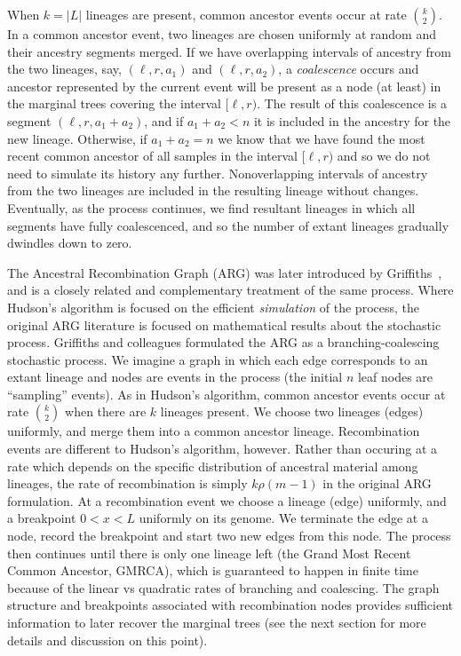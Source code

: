 \documentclass{article}
\begin{document}
When $k = |L|$ lineages are present, common ancestor events
occur at rate $\binom{k}{2}$. In a common ancestor event, two lineages
are chosen uniformly at random and their ancestry segments merged.
If we have overlapping intervals of ancestry from the two lineages,
say, $(\ell, r, a_1)$ and $(\ell, r, a_2)$, a
\emph{coalescence} occurs and ancestor represented by the current event
will be present as a node (at least) in the marginal trees covering
the interval $[\ell, r)$. The result of this coalescence is a segment
$(\ell, r, a_1 + a_2)$, and if $a_1 + a_2 < n$ it is included in the
ancestry for the new lineage. Otherwise, if $a_1 + a_2 = n$ we know that
we have found the most recent common ancestor of all samples in
the interval $[\ell, r)$ and so we do not need to simulate its history any further.
Nonoverlapping intervals of ancestry from the two lineages are included
in the resulting lineage without changes. Eventually, as the process continues,
we find resultant lineages in which all segments have fully coalescenced,
and so the number of extant lineages gradually dwindles down to zero.

The Ancestral Recombination Graph (ARG) was later introduced by
Griffiths~\citep{griffiths1991two,ethier1990two,griffiths1996ancestral,
griffiths1997ancestral}, and is a
closely related and complementary treatment of the same process. Where
Hudson's algorithm is focused on the efficient \emph{simulation} of the
process, the original ARG literature is focused on mathematical
results about the stochastic process. Griffiths and colleagues formulated the
ARG as a branching-coalescing stochastic process. We imagine a graph in which
each edge corresponds to an extant lineage and nodes are events in the
process (the initial $n$ leaf nodes are ``sampling'' events). As in Hudson's
algorithm, common ancestor events occur at rate $\binom{k}{2}$ when there
are $k$ lineages present. We choose two lineages (edges) uniformly, and merge them
into a common ancestor lineage. Recombination events are different
to Hudson's algorithm, however. Rather than occuring at a rate which depends on
the specific distribution of ancestral material among lineages, the
rate of recombination is simply $k \rho (m - 1)$ in the original ARG
formulation. At a recombination event we choose a lineage (edge) uniformly, and a
breakpoint $0 < x < L$ uniformly on its genome. We terminate the edge at a
node, record the breakpoint and start two new edges from this node. The process
then continues until there is only one lineage left (the Grand Most Recent
Common Ancestor, GMRCA), which is guaranteed to
happen in finite time because of the linear vs quadratic rates of branching
and coalescing. The graph structure and breakpoints associated with
recombination nodes provides sufficient information to later recover the marginal
trees (see the next section for more details and discussion on this point).
\end{document}
